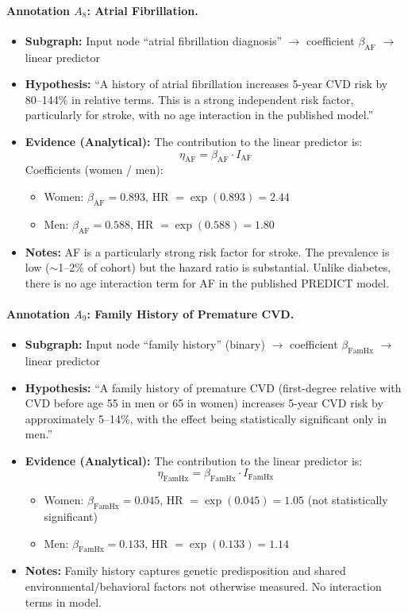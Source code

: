 \documentclass{article}
\begin{document}
\paragraph{Annotation $A_8$: Atrial Fibrillation.}
\begin{itemize}
    \item \textbf{Subgraph:} Input node ``atrial fibrillation diagnosis'' $\rightarrow$ coefficient $\beta_{\text{AF}}$ $\rightarrow$ linear predictor
    \item \textbf{Hypothesis:} ``A history of atrial fibrillation increases 5-year CVD risk by 80--144\% in relative terms. This is a strong independent risk factor, particularly for stroke, with no age interaction in the published model.''
    \item \textbf{Evidence (Analytical):} The contribution to the linear predictor is:
    \[
    \eta_{\text{AF}} = \beta_{\text{AF}} \cdot I_{\text{AF}}
    \]
    Coefficients (women / men):
    \begin{itemize}
        \item Women: $\beta_{\text{AF}} = 0.893$, HR $= \exp(0.893) = 2.44$
        \item Men: $\beta_{\text{AF}} = 0.588$, HR $= \exp(0.588) = 1.80$
    \end{itemize}
    \item \textbf{Notes:} AF is a particularly strong risk factor for stroke. The prevalence is low ($\sim$1--2\% of cohort) but the hazard ratio is substantial. Unlike diabetes, there is no age interaction term for AF in the published PREDICT model.
\end{itemize}

\paragraph{Annotation $A_9$: Family History of Premature CVD.}
\begin{itemize}
    \item \textbf{Subgraph:} Input node ``family history'' (binary) $\rightarrow$ coefficient $\beta_{\text{FamHx}}$ $\rightarrow$ linear predictor
    \item \textbf{Hypothesis:} ``A family history of premature CVD (first-degree relative with CVD before age 55 in men or 65 in women) increases 5-year CVD risk by approximately 5--14\%, with the effect being statistically significant only in men.''
    \item \textbf{Evidence (Analytical):} The contribution to the linear predictor is:
    \[
    \eta_{\text{FamHx}} = \beta_{\text{FamHx}} \cdot I_{\text{FamHx}}
    \]
    \begin{itemize}
        \item Women: $\beta_{\text{FamHx}} = 0.045$, HR $= \exp(0.045) = 1.05$ (not statistically significant)
        \item Men: $\beta_{\text{FamHx}} = 0.133$, HR $= \exp(0.133) = 1.14$
    \end{itemize}
    \item \textbf{Notes:} Family history captures genetic predisposition and shared environmental/behavioral factors not otherwise measured. No interaction terms in model.
\end{itemize}
\end{document}
